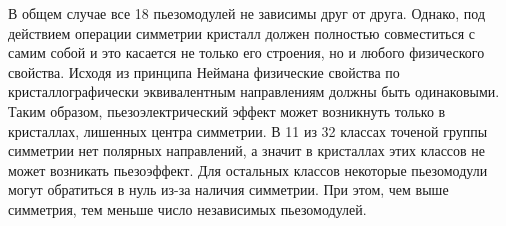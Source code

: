 В общем случае все 18 пьезомодулей не зависимы друг от друга. Однако,
под действием операции симметрии кристалл должен полностью совместиться с
самим собой и это касается не только его строения, но и любого физического свойства.
Исходя из принципа Неймана \cite{Shaskolska_1984} физические свойства
 по кристаллографически эквивалентным направлениям должны быть одинаковыми.
Таким образом, пьезоэлектрический эффект может возникнуть только в кристаллах, лишенных центра
симметрии. В 11 из 32 классах точеной группы симметрии нет полярных направлений,
а значит в кристаллах этих классов не может возникать пьезоэффект. Для остальных
классов некоторые пьезомодули могут обратиться в нуль из-за наличия симметрии.
При этом, чем выше симметрия, тем меньше число независимых пьезомодулей.
